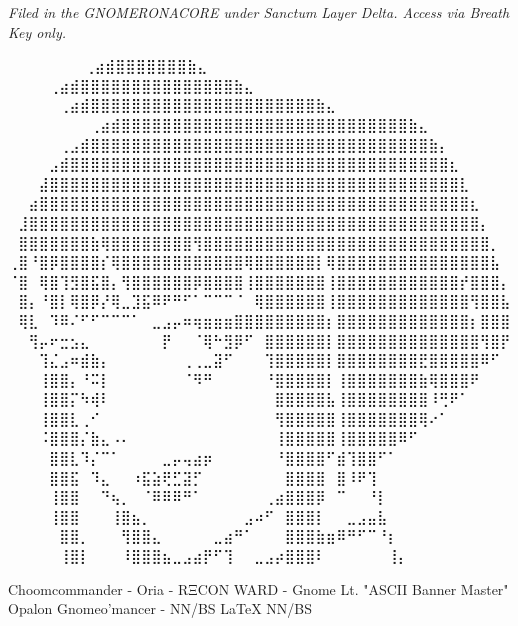\vspace{2em}
\begin{flushright}
\textit{Filed in the GNOMERONACORE under Sanctum Layer Delta. Access via Breath Key only.}
\end{flushright}

\iffalse

  ⠀⠀⠀⠀⠀             ⠀⠀⢀⣴⣾⣿⣿⣿⣿⣿⣿⣿⣷⣄⠀⠀⠀⠀⠀⠀⠀⠀
⠀⠀⠀  ⠀      ⠀⠀⠀⠀⢀⣴⣾⣿⣿⣿⣿⣿⣿⣿⣿⣿⣿⣿⣿⣿⣿⣿⣷⣄⠀⠀⠀⠀⠀⠀⠀⠀
⠀⠀ ⠀   ⠀⠀⠀⠀⠀⢀⣴⣾⣿⣿⣿⣿⣿⣿⣿⣿⣿⣿⣿⣿⣿⣿⣿⣿⣿⣿⣿⣿⣿⣿⣷⣄⠀⠀⠀⠀⠀⠀⠀⠀
⠀⠀⠀⠀⠀⠀⠀⠀⢀⣴⣾⣿⣿⣿⣿⣿⣿⣿⣿⣿⣿⣿⣿⣿⣿⣿⣿⣿⣿⣿⣿⣿⣿⣿⣿⣿⣿⣿⣿⣷⣄⠀⠀⠀⠀⠀⠀⠀⠀
⠀⠀⠀⠀⠀⢀⣠⣾⣿⣿⣿⣿⣿⣿⣿⣿⣿⣿⣿⣿⣿⣿⣿⣿⣿⣿⣿⣿⣿⣿⣿⣿⣿⣿⣿⣿⣿⣿⣿⣿⣿⣷⡄⠀⠀⠀⠀⠀⠀
⠀⠀⠀⠀⣠⣾⣿⣿⣿⣿⣿⣿⣿⣿⣿⣿⣿⣿⣿⣿⣿⣿⣿⣿⣿⣿⣿⣿⣿⣿⣿⣿⣿⣿⣿⣿⣿⣿⣿⣿⣿⣿⣿⣆⠀⠀⠀⠀⠀
⠀⠀⠀⣼⣿⣿⣿⣿⣿⣿⣿⣿⣿⣿⣿⣿⣿⣿⣿⣿⣿⣿⣿⣿⣿⣿⣿⣿⣿⣿⣿⣿⣿⣿⣿⣿⣿⣿⣿⣿⣿⣿⣿⣿⣇⠀⠀⠀⠀
⠀⠀⣴⣿⣿⣿⣿⣿⣿⣿⣿⣿⣿⣿⣿⣿⣿⣿⣿⣿⣿⣿⣿⣿⣿⣿⣿⣿⣿⣿⣿⣿⣿⣿⣿⣿⣿⣿⣿⣿⣿⣿⣿⣿⣿⣆⠀⠀⠀
⠀⣸⣿⣿⣿⣿⣿⣿⣿⣿⣿⣿⣿⣿⣿⣿⣿⣿⣿⣿⣿⣿⣿⣿⣿⣿⣿⣿⣿⣿⣿⣿⣿⣿⣿⣿⣿⣿⣿⣿⣿⣿⣿⣿⣿⣿⡄⠀⠀
⠀⣿⣿⣿⣿⣿⣿⣿⣷⢿⣿⣿⣿⣿⣿⣿⣿⣿⢻⣿⣿⣿⣿⣿⣿⣿⣿⣿⣿⣿⣿⣿⣿⣿⣿⣿⣿⣿⣿⣿⣿⣿⣿⣿⣿⣿⣿⡀⠀
⢀⣿⠘⣿⡿⣿⣿⣿⣿⡎⢿⣿⣿⣿⣿⣿⣿⣿⣿⣿⣿⣿⣿⢿⣿⣿⣿⣿⣿⣿⡇⢿⣿⣿⣿⣿⣿⣿⣿⣿⣿⣿⣿⣿⣿⣿⣿⣧⠀
⠈⣿⠀⢿⣿⢹⣻⣿⣯⣿⡄⢻⣿⣿⣿⣿⣿⣿⡿⣿⣿⣿⣿⢸⣿⣿⣿⣿⣿⣿⣿⢸⣿⣿⣿⣿⣿⣿⣿⣿⣿⣿⣿⣿⡞⣿⣿⣿⡄
⠀⣿⡄⠘⣿⡇⢿⣿⡿⡜⢿⣀⣹⣯⠿⠟⠛⠋⠁⠉⠉⠉⠈⠀⢿⣿⣿⣿⣿⣿⣿⢸⣿⣿⣿⣿⣿⣿⣿⣿⣿⣿⣿⣿⣿⢻⣿⣿⣧
⠀⢿⣇⠀⠹⠿⠌⠋⠋⠉⠉⠉⠁⠀⣀⣠⡤⠶⢶⣶⣶⣶⣿⣿⣿⣿⣿⣿⣿⣿⣿⡆⣿⣿⣿⣿⣿⣿⣿⣿⣿⣿⣿⣿⣿⡆⣿⣿⣿
⠀⠀⢻⡤⠖⣒⣢⣄⠀⠀⠀⠀⠀⠀⠀⡟⠀⠀⠈⢿⠓⣻⡿⠋⠀⣿⣿⣿⣿⣿⣿⡇⣿⣿⣿⣿⣿⣿⣿⣿⣿⣿⣿⣿⣿⣿⢻⣿⡟
⠀⠀⠀⢹⣌⣠⠶⣾⣷⡄⠀⠀⠀⠀⠀⠀⠀⢀⢀⣀⣽⠋⠀⠀⠀⢹⣿⣿⣿⣿⣿⡇⣿⣿⣿⣿⣿⣿⣿⣿⣟⣿⣿⣿⣿⣿⠿⠋⠀
⠀⠀⠀⢸⣿⣿⡄⠘⠭⡇⠀⠀⠀⠀⠀⠀⠀⠈⠻⠛⠀⠀⠀⠀⠀⠘⣿⣿⣿⣿⣿⡇⢸⣿⣿⣿⣿⣿⣿⣿⣷⢿⣿⣿⣿⠟⠀⠀⠀
⠀⠀⠀⢸⣿⣿⡍⠳⢾⠇⠀⠀⠀⠀⠀⠀⠀⠀⠀⠀⠀⠀⠀⠀⠀⠀⣿⣿⣿⣿⣿⣧⢸⣿⣿⣿⣿⣿⣿⣿⣿⠸⢛⠟⠁⠀⠀⠀⠀
⠀⠀⠀⢸⣿⣿⣇⢀⠊⠀⠀⠀⠀⠀⠀⠀⠀⠀⠀⠀⠀⠀⠀⠀⠀⠀⢻⣿⣿⣿⣿⣿⢸⣿⣿⣿⣿⣿⣿⣿⢿⠔⠁⠀⠀⠀⠀⠀⠀
⠀⠀⠀⠨⣿⣿⣿⡌⣷⣄⠠⠄⠀⠀⠀⠀⠀⠀⠀⠀⠀⠀⠀⠀⠀⠀⢸⣿⣿⣿⣿⣿⢸⣿⣿⣿⣿⣿⠿⠋⠀⠀⠀⠀⠀⠀⠀⠀⠀
⠀⠀⠀⠀⣿⣿⣇⠹⡌⠉⠁⠀⠀⠀⠀⣀⡤⢤⣴⡶⠀⠀⠀⠀⠀⠀⠘⣿⣿⣿⣿⠋⣾⢹⣿⣿⠋⠁⠀⠀⠀⠀⠀⠀⠀⠀⠀⠀⠀
⠀⠀⠀⠀⣿⣿⣯⠀⠹⣄⠀⠀⠰⣯⣵⢟⣋⣽⡋⠀⠀⠀⠀⠀⠀⠀⠀⣿⣿⣿⣿⠀⣿⠸⠟⢹⠀⠀⠀⠀⠀⠀⠀⠀⠀⠀⠀⠀⠀
⠀⠀⠀⠀⢸⣿⣿⠀⠀⠙⢦⡀⠀⠈⠿⠿⠿⠛⠁⠀⠀⠀⠀⠀⠀⢀⣴⣿⣿⣿⡿⠀⠉⠀⠀⠘⡇⠀⠀⠀⠀⠀⠀⠀⠀⠀⠀⠀⠀
⠀⠀⠀⠀⢸⣿⣿⠀⠀⠀⢸⣿⣦⡀⠀⠀⠀⠀⠀⠀⠀⠀⠀⣠⠴⠋⠀⣿⣿⣿⡇⠀⠀⣀⣠⣤⣧⠀⠀⠀⠀⠀⠀⠀⠀⠀⠀⠀⠀
⠀⠀⠀⠀⠀⣿⣿⡀⠀⠀⠀⢻⣿⣿⣄⠀⠀⠀⠀⠀⣀⣴⠛⠁⠀⠀⠀⣿⣿⣿⣷⣶⠿⠛⠋⠉⠘⡆⠀⠀⠀⠀⠀⠀⠀⠀⠀⠀⠀
⠀⠀⠀⠀⠀⢸⣿⡇⠀⠀⠀⠸⣿⣿⣿⣦⣀⣠⣴⡟⠋⢹⠀⠀⣀⣠⡴⣿⣿⣿⠇⠀⠀⠀⠀⠀⠀⢸⡄⠀⠀⠀⠀⠀⠀⠀⠀⠀⠀

Choomcommander - Oria - RΞCON WARD - Gnome Lt. "ASCII Banner Master"
             Opalon Gnomeo'mancer - NN/BS LaTeX{} NN/BS

